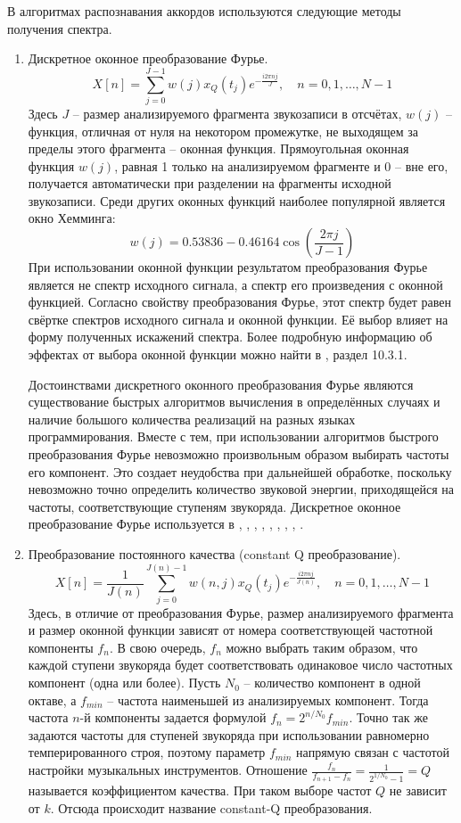 В алгоритмах распознавания аккордов используются следующие методы получения
спектра.
\begin{enumerate}
  \item Дискретное оконное преобразование Фурье.
  $$X[n] = \sum_{j=0}^{J-1} w(j)x_Q(t_j) e^{-\frac{i 2\pi nj}{J}}, \quad n=0, 1,
  \ldots, N-1$$
  Здесь $J$ -- размер анализируемого фрагмента звукозаписи в отсчётах, $w(j)$ --
  функция, отличная от нуля на некотором промежутке, не выходящем за пределы
  этого фрагмента -- оконная функция. Прямоугольная оконная функция $w(j)$,
  равная 1 только на анализируемом фрагменте и 0 -- вне его, получается
  автоматически при разделении на фрагменты исходной звукозаписи. Среди других
  оконных функций наиболее популярной является окно Хемминга:
  $$w(j) = 0.53836 - 0.46164 \cos \left( \frac{2\pi j}{J-1} \right)$$
  При использовании оконной функции результатом преобразования Фурье является не
  спектр исходного сигнала, а спектр его произведения с оконной функцией.  
  Согласно свойству преобразования Фурье, этот спектр будет равен свёртке
  спектров исходного сигнала и оконной функции. Её выбор влияет на форму
  полученных искажений спектра. Более подробную информацию об эффектах от выбора
  оконной функции можно найти в \cite{Oppenheim2006}, раздел 10.3.1.
  
  Достоинствами дискретного оконного преобразования Фурье являются существование
  быстрых алгоритмов вычисления в определённых случаях и наличие большого
  количества реализаций на разных языках программирования. Вместе с тем, при
  использовании алгоритмов быстрого преобразования Фурье невозможно произвольным
  образом выбирать частоты его компонент. Это создает неудобства при дальнейшей
  обработке, поскольку невозможно точно определить количество звуковой энергии,
  приходящейся на частоты, соответствующие ступеням звукоряда. Дискретное
  оконное преобразование Фурье используется в \cite{Sheh2003},
  \cite{Gomez2006}, \cite{Burgoyne2007}, \cite{Papadopoulos2007},
  \cite{Khadkevich2009}, \cite{Weller2009}, \cite{Mauch2010},
  \cite{Khadkevich2011}, \cite{DeHaas2012}.
  
  \item Преобразование постоянного качества (constant Q преобразование).
  $$X[n] = \frac{1}{J(n)} \sum_{j=0}^{J(n)-1} w(n,j)x_Q(t_j) e^{-\frac{i 2\pi
  nj}{J(n)}}, \quad n=0, 1, \ldots, N-1$$ Здесь, в отличие от преобразования
  Фурье, размер анализируемого фрагмента и размер оконной функции зависят от
  номера соответствующей частотной компоненты $f_n$. В свою очередь, $f_n$ можно
  выбрать таким образом, что каждой ступени звукоряда будет соответствовать
  одинаковое число частотных компонент (одна или более). Пусть $N_0$ --
  количество компонент в одной октаве, а $f_{min}$ -- частота наименьшей из
  анализируемых компонент. Тогда частота $n$-й компоненты задается формулой
  $f_n = 2^{n/N_0} f_{min}$. Точно так же задаются частоты для ступеней
  звукоряда при использовании равномерно темперированного строя, поэтому
  параметр $f_{min}$ напрямую связан с частотой настройки музыкальных
  инструментов. Отношение $\frac{f_n}{f_{n+1} - f_n} = \frac{1}{2^{1/N_0}-1} =
  Q$ называется коэффициентом качества. При таком выборе частот $Q$ не зависит
  от $k$. Отсюда происходит название constant-Q преобразования.
  

\end{enumerate}
